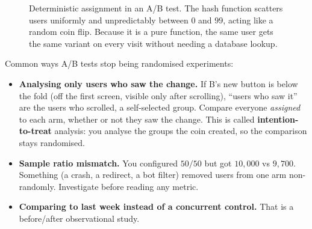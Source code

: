 \begin{figure}[H]
\centering
{}
\caption{Deterministic assignment in an A/B test. The hash function scatters users uniformly and unpredictably between $0$ and $99$, acting like a random coin flip. Because it is a pure function, the same user gets the same variant on every visit without needing a database lookup.}
\label{fig:sampling-hash}
\end{figure}

\begin{trapbox}
Common ways A/B tests stop being randomised experiments:
\begin{itemize}
  \item \textbf{Analysing only users who saw the change.} If B's new button is below the
  fold (off the first screen, visible only after scrolling), ``users who saw it'' are the users who scrolled, a self-selected group.
  Compare everyone \emph{assigned} to each arm, whether or not they saw the change.
  This is called \textbf{intention-to-treat} analysis: you analyse the groups the coin
  created, so the comparison stays randomised.
  \item \textbf{Sample ratio mismatch.} You configured $50/50$ but got $10{,}000$ vs
  $9{,}700$. Something (a crash, a redirect, a bot filter) removed users from one arm
  non-randomly. Investigate before reading any metric.
  \item \textbf{Comparing to last week instead of a concurrent control.} That is a
  before/after observational study.
\end{itemize}
\end{trapbox}

